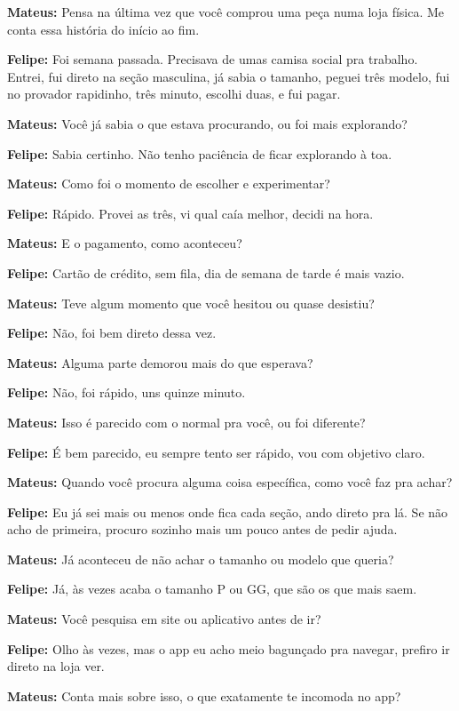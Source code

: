 \textbf{Mateus:} Pensa na última vez que você comprou uma peça numa loja física. Me conta essa história do início ao fim.

\textbf{Felipe:} Foi semana passada. Precisava de umas camisa social pra trabalho. Entrei, fui direto na seção masculina, já sabia o tamanho, peguei três modelo, fui no provador rapidinho, três minuto, escolhi duas, e fui pagar.

\textbf{Mateus:} Você já sabia o que estava procurando, ou foi mais explorando?

\textbf{Felipe:} Sabia certinho. Não tenho paciência de ficar explorando à toa.

\textbf{Mateus:} Como foi o momento de escolher e experimentar?

\textbf{Felipe:} Rápido. Provei as três, vi qual caía melhor, decidi na hora.

\textbf{Mateus:} E o pagamento, como aconteceu?

\textbf{Felipe:} Cartão de crédito, sem fila, dia de semana de tarde é mais vazio.

\textbf{Mateus:} Teve algum momento que você hesitou ou quase desistiu?

\textbf{Felipe:} Não, foi bem direto dessa vez.

\textbf{Mateus:} Alguma parte demorou mais do que esperava?

\textbf{Felipe:} Não, foi rápido, uns quinze minuto.

\textbf{Mateus:} Isso é parecido com o normal pra você, ou foi diferente?

\textbf{Felipe:} É bem parecido, eu sempre tento ser rápido, vou com objetivo claro.

\textbf{Mateus:} Quando você procura alguma coisa específica, como você faz pra achar?

\textbf{Felipe:} Eu já sei mais ou menos onde fica cada seção, ando direto pra lá. Se não acho de primeira, procuro sozinho mais um pouco antes de pedir ajuda.

\textbf{Mateus:} Já aconteceu de não achar o tamanho ou modelo que queria?

\textbf{Felipe:} Já, às vezes acaba o tamanho P ou GG, que são os que mais saem.

\textbf{Mateus:} Você pesquisa em site ou aplicativo antes de ir?

\textbf{Felipe:} Olho às vezes, mas o app eu acho meio bagunçado pra navegar, prefiro ir direto na loja ver.

\textbf{Mateus:} Conta mais sobre isso, o que exatamente te incomoda no app?

